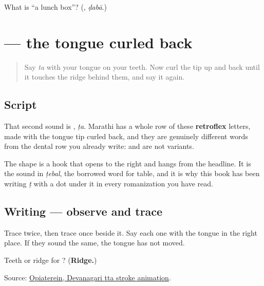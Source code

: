 \begin{tcolorbox}[breakable,colback=teal!4,colframe=teal!35!black,title={Before you move on}]
What is \textquotedblleft{}a lunch box\textquotedblright{}? (\textbf{}, \emph{ḍabā}.)
\end{tcolorbox}
\section[\texorpdfstring{\mr{ट} (ṭa)}{ट (ṭa)}]{ — the tongue curled back}

\label{lesson:MR-W07-tta}



\begin{quote}
Say \emph{ta} with your tongue on your teeth. Now curl the tip up and back until it touches the ridge behind them, and say it again.
\end{quote}

\subsection*{Script}
\begin{quote}
\end{quote}

That second sound is \textbf{}, \emph{ṭa}. Marathi has a whole row of these \textbf{retroflex} letters, made with the tongue tip curled back, and they are genuinely different words from the dental row you already write: \textbf{} and \textbf{} are not variants.

The shape is a hook that opens to the right and hangs from the headline. It is the sound in \emph{ṭebal}, the borrowed word for table, and it is why this book has been writing \emph{ṭ} with a dot under it in every romanization you have read.

\subsection*{Writing — observe and trace}

Trace \textbf{} twice, then trace \textbf{} once beside it. Say each one with the tongue in the right place. If they sound the same, the tongue has not moved.

\begin{tcolorbox}[breakable,colback=teal!4,colframe=teal!35!black,title={Before you move on}]
Teeth or ridge for \textbf{}? (\textbf{Ridge.})

Source: \href{https://commons.wikimedia.org/wiki/File:Deva-\%E0\%A4\%9F-order.gif}{Opiaterein, Devanagari tta stroke animation}.
\end{tcolorbox}
